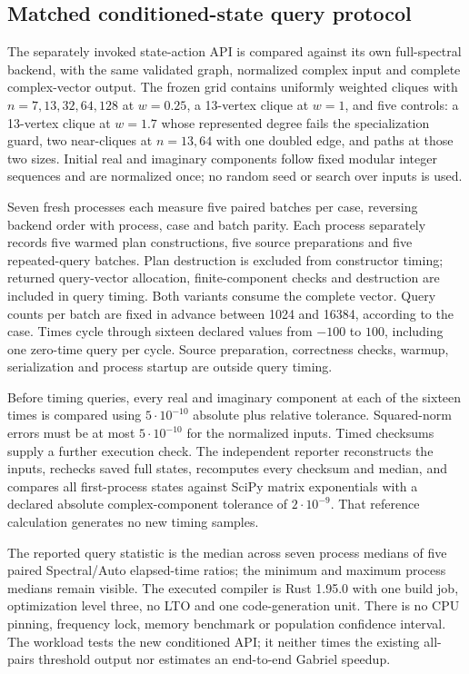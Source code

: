 \documentclass[11pt,a4paper]{article}
\theoremstyle{definition}\newtheorem{definition}[theorem]{Definition}
\begin{document}
\subsection{Matched conditioned-state query protocol}\label{sec:conditionedprotocol}
The separately invoked state-action API is compared against its own full-spectral
backend, with the same validated graph, normalized complex input and complete
complex-vector output. The frozen grid contains uniformly weighted cliques with
$n=7,13,32,64,128$ at $w=0.25$, a 13-vertex clique at $w=1$, and five controls:
a 13-vertex clique at $w=1.7$ whose represented degree fails the specialization
guard, two near-cliques at $n=13,64$ with one doubled edge, and paths at those two
sizes. Initial real and imaginary components follow fixed modular integer
sequences and are normalized once; no random seed or search over inputs is used.

Seven fresh processes each measure five paired batches per case, reversing
backend order with process, case and batch parity. Each process separately
records five warmed plan constructions, five source preparations and five
repeated-query batches. Plan destruction is excluded from constructor timing;
returned query-vector allocation, finite-component checks and destruction are
included in query timing. Both variants consume the complete vector. Query
counts per batch are fixed in advance between 1024 and 16384, according to the
case. Times cycle through sixteen declared values from $-100$ to $100$, including
one zero-time query per cycle. Source preparation, correctness checks, warmup,
serialization and process startup are outside query timing.

Before timing queries, every real and imaginary component at each of the sixteen
times is compared using $5\cdot10^{-10}$ absolute plus relative tolerance.
Squared-norm errors must be at most $5\cdot10^{-10}$ for the normalized inputs.
Timed checksums supply a further execution check. The independent reporter
reconstructs the inputs, rechecks saved full states, recomputes every checksum
and median, and compares all first-process states against SciPy matrix
exponentials with a declared absolute complex-component tolerance of
$2\cdot10^{-9}$. That reference calculation generates no new timing samples.

The reported query statistic is the median across seven process medians of five
paired Spectral/Auto elapsed-time ratios; the minimum and maximum process
medians remain visible. The executed compiler is Rust 1.95.0 with one build job,
optimization level three, no LTO and one code-generation unit. There is no CPU
pinning, frequency lock, memory benchmark or population confidence interval.
The workload tests the new conditioned API; it neither times the existing
all-pairs threshold output nor estimates an end-to-end Gabriel speedup.
\end{document}
